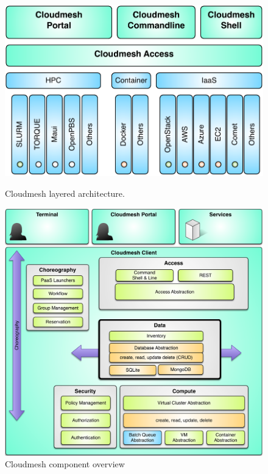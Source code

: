 \begin{figure}[!h]
    \includegraphics[width=1.0\columnwidth]{images/client/cloudmesh-arch-1.pdf}
    \caption{Cloudmesh layered architecture.}
    \label{F:arch-layer}
\bigskip
    \includegraphics[width=1.0\columnwidth]{images/client/cloudmesh-arch-2.pdf}
    \caption{Cloudmesh component overview}
    \label{F:arch-component}


\end{figure}
